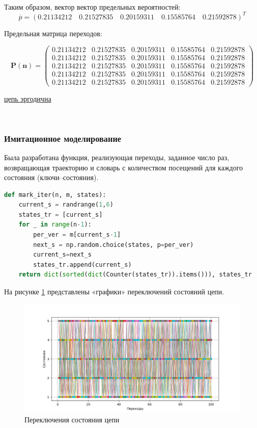 ~\\

Таким образом, вектор вектор предельных вероятностей:
$$\overline{p}=(0.21134212\quad 0.21527835\quad 0.20159311\quad 0.15585764\quad 0.21592878)^T$$

Предельная матрица переходов:

$$\mathbf{P(n)}=\begin{pmatrix}
0.21134212 &0.21527835 &0.20159311 &0.15585764 &0.21592878\\
0.21134212 &0.21527835 &0.20159311 &0.15585764 &0.21592878\\
0.21134212 &0.21527835 &0.20159311 &0.15585764 &0.21592878\\
0.21134212 &0.21527835 &0.20159311 &0.15585764 &0.21592878\\
0.21134212 &0.21527835 &0.20159311 &0.15585764 &0.21592878
\end{pmatrix}$$

\underline{цепь эргодична}

~\\

\subsubsection{Имитационное моделирование}

 Была разработана функция, реализующая переходы, заданное число раз, возвращающая траекторию и словарь с количеством посещений для каждого состояния (ключи--состояния).

 \begin{lstlisting}[language=python, label=prog,caption={\textit{реализация марковского процесса}}]
def mark_iter(n, m, states):
    current_s = randrange(1,6)
    states_tr = [current_s]
    for _ in range(n-1):
        per_ver = m[current_s-1]
        next_s = np.random.choice(states, p=per_ver)
        current_s=next_s
        states_tr.append(current_s)
    return dict(sorted(dict(Counter(states_tr)).items())), states_tr
\end{lstlisting}

На рисунке \ref{iter} представлены «графики» переключений состояний цепи.

\begin{figure}[!h]
\centerline{\includegraphics[scale = 1.]{Images/iter.png}}
\caption{Переключения состояния цепи}
\label{iter}
\end{figure}



